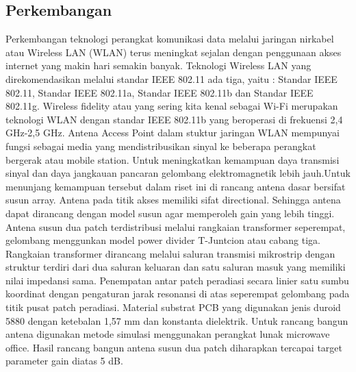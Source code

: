 \subsection {Perkembangan}
Perkembangan teknologi perangkat komunikasi data melalui jaringan nirkabel atau Wireless LAN (WLAN) terus meningkat sejalan dengan 
penggunaan akses internet yang makin hari semakin banyak. Teknologi Wireless LAN yang direkomendasikan melalui standar IEEE 802.11 
ada tiga, yaitu : Standar IEEE 802.11, Standar IEEE 802.11a, 
Standar IEEE 802.11b dan Standar IEEE 802.11g. Wireless fidelity atau yang sering 
kita kenal sebagai Wi-Fi merupakan teknologi WLAN dengan standar IEEE 802.11b yang beroperasi di frekuensi 2,4 GHz-2,5 GHz. Antena Access 
Point dalam stuktur jaringan WLAN mempunyai fungsi sebagai media yang mendistribusikan sinyal ke beberapa perangkat bergerak atau mobile 
station. Untuk meningkatkan kemampuan daya transmisi sinyal dan daya jangkauan pancaran gelombang elektromagnetik lebih jauh.Untuk 
menunjang kemampuan tersebut dalam riset ini di rancang antena dasar bersifat susun array. Antena pada titik akses memiliki sifat 
directional. Sehingga antena dapat dirancang dengan model susun agar memperoleh gain yang lebih tinggi. Antena susun dua patch 
terdistribusi melalui rangkaian transformer seperempat, gelombang menggunkan model power divider T-Juntcion atau cabang tiga. Rangkaian transformer 
dirancang melalui saluran transmisi mikrostrip dengan struktur terdiri dari dua saluran keluaran dan satu saluran masuk yang memiliki 
nilai impedansi sama. Penempatan antar patch peradiasi secara linier satu sumbu koordinat dengan pengaturan jarak resonansi di atas 
seperempat gelombang pada titik pusat patch peradiasi. Material substrat PCB yang digunakan jenis duroid 5880 dengan ketebalan 1,57 mm dan
konstanta dielektrik. Untuk rancang bangun antena digunakan metode simulasi menggunakan perangkat lunak microwave office. Hasil rancang bangun antena susun dua patch diharapkan tercapai target parameter gain diatas 5 dB.
 
 \cite {yustiyan2006analisa}
 \cite {arief2007teknologi}
 \cite {darsono2012rancang}
 \cite {yudianto2007jaringan}